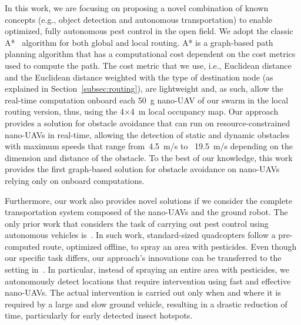 In this work, we are focusing on proposing a novel combination of known concepts (e.g., object detection and autonomous transportation) to enable optimized, fully autonomous pest control in the open field.
We adopt the classic A*~\citep{hart1968formal} algorithm for both global and local routing.
A* is a graph-based path planning algorithm that has a computational cost dependent on the cost metrics used to compute the path.
The cost metric that we use, i.e., Euclidean distance and the Euclidean distance weighted with the type of destination node (as explained in Section~\ref{subsec:routing}), are lightweight and, as such, allow the real-time computation onboard each \SI{50}{\gram} nano-UAV of our swarm in the local routing version, thus, using the 4$\times$\SI{4}{\meter} local occupancy map.
Our approach provides a solution for obstacle avoidance that can run on resource-constrained nano-UAVs in real-time, allowing the detection of static and dynamic obstacles with maximum speeds that range from~\SI{4.5}{\meter/\second} to ~\SI{19.5}{\meter/\second} depending on the dimension and distance of the obstacle.
To the best of our knowledge, this work provides the first graph-based solution for obstacle avoidance on nano-UAVs relying only on onboard computations.


Furthermore, our work also provides novel solutions if we consider the complete transportation system composed of the nano-UAVs and the ground robot. 
The only prior work that considers the task of carrying out pest control using autonomous vehicles is~\citet{du2017precision}. 
In such work, standard-sized quadcopters follow a pre-computed route, optimized offline, to spray an area with pesticides. 
Even though our specific task differs, our approach's innovations can be transferred to the setting in~\citet{du2017precision}. 
In particular, instead of spraying an entire area with pesticides, we autonomously detect locations that require intervention using fast and effective nano-UAVs. 
The actual intervention is carried out only when and where it is required by a large and slow ground vehicle, resulting in a drastic reduction of time, particularly for early detected insect hotspots.
